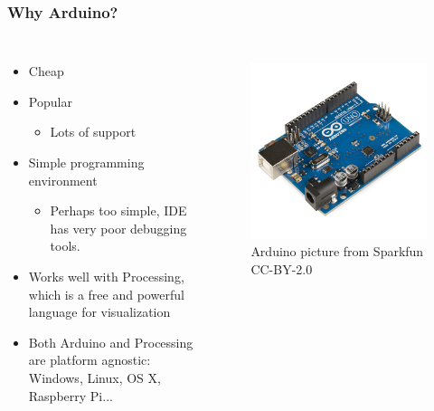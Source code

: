 \documentclass{beamer}
\begin{document}
\begin{frame}
\frametitle{Why Arduino?}
\begin{columns}[t]
\begin{itemize}
\item{Cheap}
\item {Popular}
\begin{itemize}
\item {Lots of support}
\end{itemize}
\item {Simple programming environment}
\begin{itemize}
\item {Perhaps too simple, IDE has very poor debugging tools.}
\end{itemize}
\item{Works well with Processing, which is a free and powerful language for visualization}
\item{Both Arduino and Processing are platform agnostic: Windows, Linux, OS X, Raspberry Pi...}
\end{itemize}
\begin{figure}
\hspace*{-.75cm}\includegraphics[scale=.25]{Arduino_Uno_-_R3.jpg}\\
\tiny {Arduino picture from Sparkfun CC-BY-2.0}
\end{figure}
\end{columns}
\end{frame}
\end{document}
